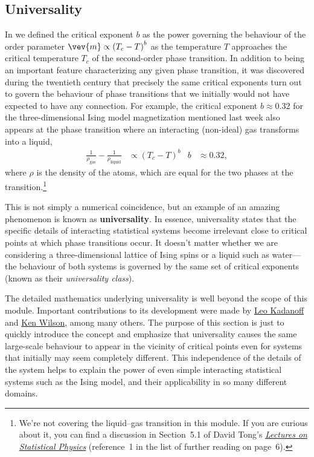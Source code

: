 \subsection{Universality}
In  we defined the critical exponent $b$ as the power governing the behaviour of the order parameter $\vev{m} \propto \left(T_c - T\right)^b$ as the temperature $T$ approaches the critical temperature $T_c$ of the second-order phase transition.
In addition to being an important feature characterizing any given phase transition, it was discovered during the twentieth century that precisely the same critical exponents turn out to govern the behaviour of phase transitions that we initially would not have expected to have any connection.
For example, the critical exponent $b \approx 0.32$ for the three-dimensional Ising model magnetization mentioned last week also appears at the phase transition where an interacting (non-ideal) gas transforms into a liquid,
\begin{align*}
  \frac{1}{\rho_{\text{gas}}} - \frac{1}{\rho_{\text{liquid}}} & \propto \left(T_c - T\right)^b &
  b & \approx 0.32,
\end{align*}
where $\rho$ is the density of the atoms, which are equal for the two phases at the transition.\footnote{We're not covering the liquid--gas transition in this module.  If you are curious about it, you can find a discussion in Section~5.1 of David Tong's \href{https://www.damtp.cam.ac.uk/user/tong/statphys.html}{\textit{Lectures on Statistical Physics}} (reference~1 in the list of further reading on page~6).}

This is not simply a numerical coincidence, but an example of an amazing phenomenon is known as \textbf{universality}.
In essence, universality states that the specific details of interacting statistical systems become irrelevant close to critical points at which phase transitions occur.
It doesn't matter whether we are considering a three-dimensional lattice of Ising spins or a liquid such as water---the behaviour of both systems is governed by the same set of critical exponents (known as their \textit{universality class}).

The detailed mathematics underlying universality is well beyond the scope of this module.
Important contributions to its development were made by \href{https://en.wikipedia.org/wiki/Leo_Kadanoff}{Leo Kadanoff} and \href{https://en.wikipedia.org/wiki/Kenneth_G._Wilson}{Ken Wilson}, among many others.
The purpose of this section is just to quickly introduce the concept and emphasize that universality causes the same large-scale behaviour to appear in the vicinity of critical points even for systems that initially may seem completely different.
This independence of the details of the system helps to explain the power of even simple interacting statistical systems such as the Ising model, and their applicability in so many different domains.



